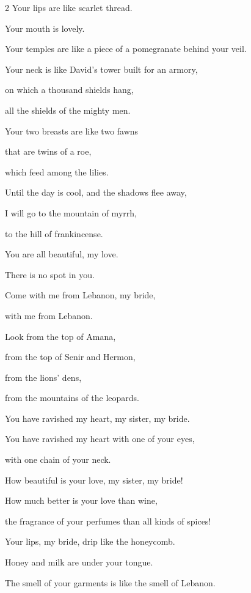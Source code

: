 \begin{multicols}{2}
\myverse{}Your lips are like scarlet thread.

Your mouth is lovely.

Your temples are like a piece of a pomegranate behind your veil.

\myverse{}Your neck is like David’s tower built for an armory,

on which a thousand shields hang,

all the shields of the mighty men.

\myverse{}Your two breasts are like two fawns

that are twins of a roe,

which feed among the lilies.


\vspace{\baselineskip}

 \myverse{}Until the day is cool, and the shadows flee away,

I will go to the mountain of myrrh,

to the hill of frankincense.


\vspace{\baselineskip} 

\myverse{}You are all beautiful, my love.

There is no spot in you.

\myverse{}Come with me from Lebanon, my bride,

with me from Lebanon.

Look from the top of Amana,

from the top of Senir and Hermon,

from the lions’ dens,

from the mountains of the leopards.


\vspace{\baselineskip}

 \myverse{}You have ravished my heart, my sister, my bride.

You have ravished my heart with one of your eyes,

with one chain of your neck.

\myverse{}How beautiful is your love, my sister, my bride!

How much better is your love than wine,

the fragrance of your perfumes than all kinds of spices!

\myverse{}Your lips, my bride, drip like the honeycomb.

Honey and milk are under your tongue.

The smell of your garments is like the smell of Lebanon.


\end{multicols}
